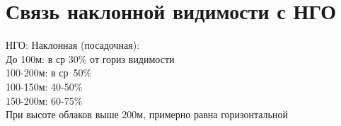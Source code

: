 
\section{Связь наклонной видимости с НГО}
НГО: \hspace{4mm} Наклонная (посадочная):\\
До 100м: в ср 30\% от гориз видимости\\
100-200м: в ср\ 50\%\\
100-150м: 40-50\%\\
150-200м: 60-75\%\\
При высоте облаков выше 200м, примерно равна горизонтальной
